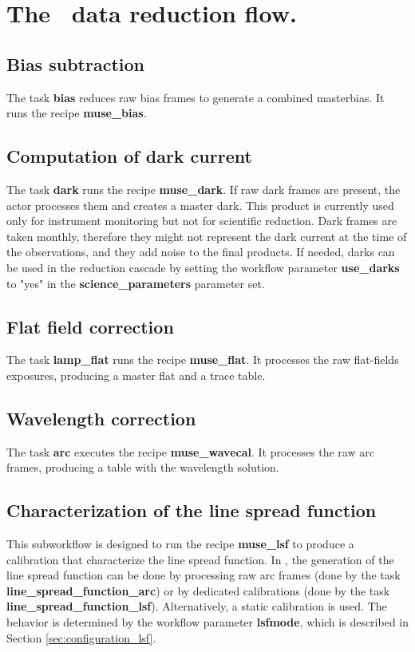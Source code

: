 \section{The \instname\ data reduction flow.}
\label{sec:reduction_flow}


\subsection{Bias subtraction}
The task {\bf bias} reduces raw bias frames to generate a combined masterbias. It
runs the recipe {\bf muse\_bias}.

\subsection{Computation of dark current}
The task {\bf dark} runs the recipe {\bf muse\_dark}. If raw dark
frames are present, the actor processes them and creates a master
dark. This product is currently used only for instrument monitoring
but not for scientific reduction. Dark frames are taken monthly,
therefore they might not represent the dark current at the time of the
observations, and they add noise to the final products. If needed,
darks can be used in the reduction cascade by setting the workflow
parameter {\bf use\_darks} to "yes" in the {\bf science\_parameters}
parameter set.

\subsection{Flat field correction}
The task {\bf lamp\_flat} runs the recipe {\bf muse\_ﬂat}. It processes the raw ﬂat-ﬁelds
exposures, producing a master ﬂat and a trace table.

\subsection{Wavelength correction}
The task {\bf arc} executes the recipe {\bf muse\_wavecal}. It processes the raw arc frames,
producing a table with the wavelength solution.

\subsection{Characterization of the line spread function}

This subworkflow is designed to run the recipe {\bf muse\_lsf}
to produce a calibration that characterize the line spread function.
In \instname, the generation of the line spread function can be done by
processing raw arc frames (done by the task
{\bf line\_spread\_function\_arc}) or by dedicated calibrations (done by the
task {\bf line\_spread\_function\_lsf}). Alternatively, a static calibration
is used. The behavior is determined by the workflow parameter
{\bf lsfmode}, which is described in Section \ref{sec:configuration_lsf}.






